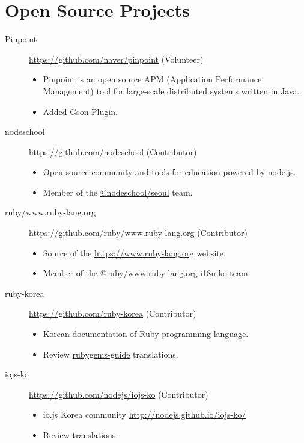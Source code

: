 \documentclass[a4paper,10pt]{article}
\begin{document}
\section{Open Source Projects}
\begin{description}
  \item[Pinpoint] \url{https://github.com/naver/pinpoint} (Volunteer)
    \begin{itemize}
      \item Pinpoint is an open source APM (Application Performance Management) tool for large-scale distributed systems written in Java.
      \item Added Gson Plugin.
    \end{itemize}
  \item[nodeschool] \url{https://github.com/nodeschool} (Contributor)
    \begin{itemize}
      \item Open source community and tools for education powered by node.js.
      \item Member of the \href{https://github.com/orgs/nodeschool/teams/seoul}{@nodeschool/seoul} team.
    \end{itemize}
  \item[ruby/www.ruby-lang.org] \url{https://github.com/ruby/www.ruby-lang.org} (Contributor)
    \begin{itemize}
      \item Source of the \url{https://www.ruby-lang.org} website.
      \item Member of the \href{https://github.com/orgs/ruby/teams/www-ruby-lang-org-i18n-ko}{@ruby/www.ruby-lang.org-i18n-ko} team.
    \end{itemize}
  \item[ruby-korea] \url{https://github.com/ruby-korea} (Contributor)
    \begin{itemize}
      \item Korean documentation of Ruby programming language.
      \item Review \href{https://github.com/ruby-korea/rubygems-guides}{rubygems-guide} translations.
    \end{itemize}
  \item[iojs-ko] \url{https://github.com/nodejs/iojs-ko} (Contributor)
    \begin{itemize}
      \item io.js Korea community \url{http://nodejs.github.io/iojs-ko/}
      \item Review translations.
    \end{itemize}

\end{description}
\end{document}
